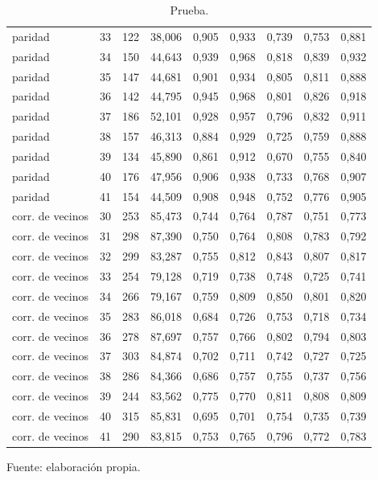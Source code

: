 \begin{table}[htbp]
{\begin{tabular}{@{}lrrrrrrrr@{}}
        paridad & 33 & 122 & 38,006 & 0,905 & 0,933 & 0,739 & 0,753 & 0,881 \\
        paridad & 34 & 150 & 44,643 & 0,939 & 0,968 & 0,818 & 0,839 & 0,932 \\
        paridad & 35 & 147 & 44,681 & 0,901 & 0,934 & 0,805 & 0,811 & 0,888 \\
        paridad & 36 & 142 & 44,795 & 0,945 & 0,968 & 0,801 & 0,826 & 0,918 \\
        paridad & 37 & 186 & 52,101 & 0,928 & 0,957 & 0,796 & 0,832 & 0,911 \\
        paridad & 38 & 157 & 46,313 & 0,884 & 0,929 & 0,725 & 0,759 & 0,888 \\
        paridad & 39 & 134 & 45,890 & 0,861 & 0,912 & 0,670 & 0,755 & 0,840 \\
        paridad & 40 & 176 & 47,956 & 0,906 & 0,938 & 0,733 & 0,768 & 0,907 \\
        paridad & 41 & 154 & 44,509 & 0,908 & 0,948 & 0,752 & 0,776 & 0,905 \\
        corr. de vecinos & 30 & 253 & 85,473 & 0,744 & 0,764 & 0,787 & 0,751 & 0,773 \\
        corr. de vecinos & 31 & 298 & 87,390 & 0,750 & 0,764 & 0,808 & 0,783 & 0,792 \\
        corr. de vecinos & 32 & 299 & 83,287 & 0,755 & 0,812 & 0,843 & 0,807 & 0,817 \\
        corr. de vecinos & 33 & 254 & 79,128 & 0,719 & 0,738 & 0,748 & 0,725 & 0,741 \\
        corr. de vecinos & 34 & 266 & 79,167 & 0,759 & 0,809 & 0,850 & 0,801 & 0,820 \\
        corr. de vecinos & 35 & 283 & 86,018 & 0,684 & 0,726 & 0,753 & 0,718 & 0,734 \\
        corr. de vecinos & 36 & 278 & 87,697 & 0,757 & 0,766 & 0,802 & 0,794 & 0,803 \\
        corr. de vecinos & 37 & 303 & 84,874 & 0,702 & 0,711 & 0,742 & 0,727 & 0,725 \\
        corr. de vecinos & 38 & 286 & 84,366 & 0,686 & 0,757 & 0,755 & 0,737 & 0,756 \\
        corr. de vecinos & 39 & 244 & 83,562 & 0,775 & 0,770 & 0,811 & 0,808 & 0,809 \\
        corr. de vecinos & 40 & 315 & 85,831 & 0,695 & 0,701 & 0,754 & 0,735 & 0,739 \\
        corr. de vecinos & 41 & 290 & 83,815 & 0,753 & 0,765 & 0,796 & 0,772 & 0,783 \\
        \bottomrule
    \end{tabular}}

    \caption{Prueba.}
    \label{tab:e_tiempo_spearman_f}

    {\footnotesize Fuente: elaboración propia.}
\end{table}
